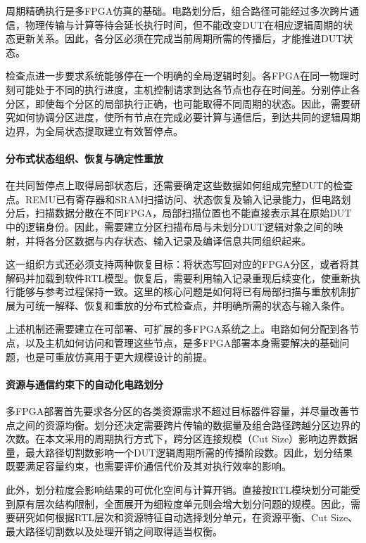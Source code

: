 周期精确执行是多FPGA仿真的基础。电路划分后，组合路径可能经过多次跨片通信，物理传输与计算等待会延长执行时间，但不能改变DUT在相应逻辑周期的状态更新关系。因此，各分区必须在完成当前周期所需的传播后，才能推进DUT状态。

检查点进一步要求系统能够停在一个明确的全局逻辑时刻。各FPGA在同一物理时刻可能处于不同的执行进度，主机控制请求到达各节点也存在时间差。分别停止各分区，即使每个分区的局部执行正确，也可能取得不同周期的状态。因此，需要研究如何协调分区进度，使所有节点在完成必要计算与通信后，到达共同的逻辑周期边界，为全局状态提取建立有效暂停点。

\paragraph{分布式状态组织、恢复与确定性重放}

在共同暂停点上取得局部状态后，还需要确定这些数据如何组成完整DUT的检查点。REMU已有寄存器和SRAM扫描访问、状态恢复及输入记录能力，但电路划分后，扫描数据分散在不同FPGA，局部扫描位置也不能直接表示其在原始DUT中的逻辑身份。因此，需要建立分区扫描布局与未划分DUT逻辑对象之间的映射，并将各分区数据与内存状态、输入记录及编译信息共同组织起来。

这一组织方式还必须支持两种恢复目标：将状态写回对应的FPGA分区，或者将其解码并加载到软件RTL模型。恢复后，需要利用输入记录重现后续变化，使重新执行能够与参考过程保持一致。这里的核心问题是如何将已有局部扫描与重放机制扩展为可统一解释、恢复和重放的分布式检查点，并明确所需的状态与输入条件。

上述机制还需要建立在可部署、可扩展的多FPGA系统之上。电路如何分配到各节点，以及主机如何访问和管理这些节点，是多FPGA部署本身需要解决的基础问题，也是可重放仿真用于更大规模设计的前提。

\paragraph{资源与通信约束下的自动化电路划分}

多FPGA部署首先要求各分区的各类资源需求不超过目标器件容量，并尽量改善节点之间的资源均衡。划分还决定需要跨片传输的数据量及组合路径跨越分区边界的次数。在本文采用的周期执行方式下，跨分区连接规模（Cut Size）影响边界数据量，最大路径切割数影响一个DUT逻辑周期所需的传播阶段数。因此，划分结果既要满足容量约束，也需要评价通信代价及其对执行效率的影响。

此外，划分粒度会影响结果的可优化空间与计算开销。直接按RTL模块划分可能受到原有层次结构限制，全面展开为细粒度单元则会增大划分问题的规模。因此，需要研究如何根据RTL层次和资源特征自动选择划分单元，在资源平衡、Cut Size、最大路径切割数以及处理开销之间取得适当权衡。

